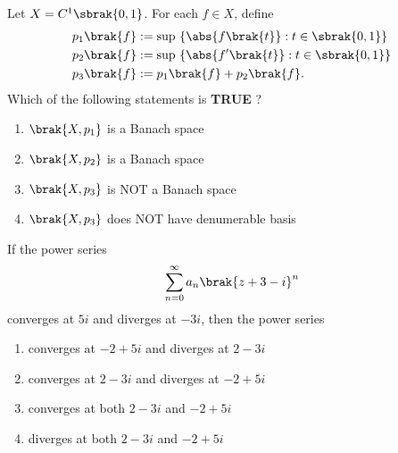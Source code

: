 \item Let $X = C^1\sbrak{0, 1}$. For each $f \in X$, define
\begin{align*}
    p_1\brak{f} & := \sup\ \{\abs{f\brak{t}}: t \in \sbrak{0, 1}\} \\
    p_2\brak{f} & := \sup\ \{\abs{f'\brak{t}}: t \in \sbrak{0, 1}\} \\
    p_3\brak{f} & := p_1\brak{f} + p_2\brak{f}.
\end{align*}
Which of the following statements is \textbf{TRUE} ?
\begin{enumerate}
    \item $\brak{X, p_1}$ is a Banach space
    \item $\brak{X, p_2}$ is a Banach space
    \item $\brak{X, p_3}$ is NOT a Banach space
    \item $\brak{X, p_3}$ does NOT have denumerable basis \\
\end{enumerate}
\item If the power series
\begin{align*}
    \sum_{n=0}^{\infty} a_n\brak{z + 3 - i}^n
\end{align*}
converges at $5i$ and diverges at $-3i$, then the power series
\begin{enumerate}
    \item converges at $-2 + 5i$ and diverges at $2 - 3i$
    \item converges at $2 - 3i$ and diverges at $-2 + 5i$
    \item converges at both $2 - 3i$ and $-2 + 5i$
    \item diverges at both $2 - 3i$ and $-2 + 5i$ \\
\end{enumerate}
